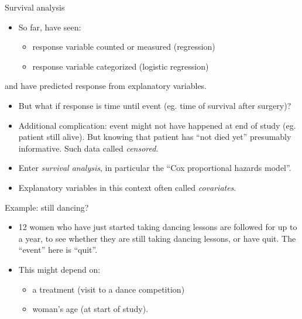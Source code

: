 \documentclass[
  ignorenonframetext,
]{beamer}
\begin{document}
\begin{frame}{Survival analysis}
\protect\hypertarget{survival-analysis-1}{}

\begin{itemize}
\item
  So far, have seen:

  \begin{itemize}
  \item
    response variable counted or measured (regression)
  \item
    response variable categorized (logistic regression)
  \end{itemize}
\end{itemize}

and have predicted response from explanatory variables.

\begin{itemize}
\item
  But what if response is time until event (eg. time of survival after
  surgery)?
\item
  Additional complication: event might not have happened at end of study
  (eg. patient still alive). But knowing that patient has ``not died
  yet'' presumably informative. Such data called \emph{censored}.
\item
  Enter \emph{survival analysis}, in particular the ``Cox proportional
  hazards model''.
\item
  Explanatory variables in this context often called \emph{covariates}.
\end{itemize}

\end{frame}

\begin{frame}{Example: still dancing?}
\protect\hypertarget{example-still-dancing}{}

\begin{itemize}
\item
  12 women who have just started taking dancing lessons are followed for
  up to a year, to see whether they are still taking dancing lessons, or
  have quit. The ``event'' here is ``quit''.
\item
  This might depend on:

  \begin{itemize}
  \item
    a treatment (visit to a dance competition)
  \item
    woman's age (at start of study).
  \end{itemize}
\end{itemize}

\end{frame}
\end{document}
